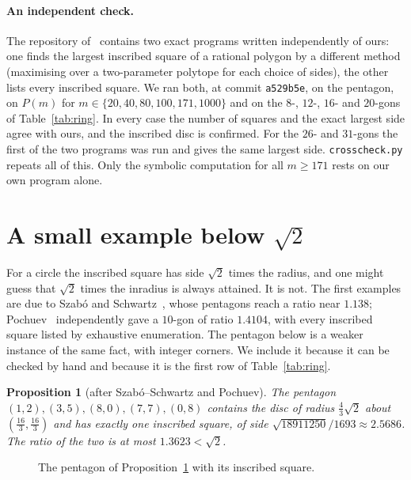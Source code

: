 \documentclass[11pt,a4paper]{article}
\newtheorem{proposition}[theorem]{Proposition}
\theoremstyle{remark}\newtheorem{remark}[theorem]{Remark}
\begin{document}
\paragraph{An independent check.} The repository of~\cite{schulz} contains two exact
programs written independently of ours: one finds the largest inscribed square of
a rational polygon by a different method (maximising over a two-parameter
polytope for each choice of sides), the other lists every inscribed square. We
ran both, at commit \texttt{a529b5e}, on the pentagon, on $P(m)$ for
$m\in\{20,40,80,100,171,1000\}$ and on the $8$-, $12$-, $16$- and $20$-gons of
Table~\ref{tab:ring}. In every case the number of squares and the exact largest
side agree with ours, and the inscribed disc is confirmed.
For the $26$- and $31$-gons the first of the two programs was run and gives the
same largest side. \texttt{crosscheck.py} repeats all of this. Only the symbolic computation
for all $m\ge171$ rests on our own program alone.

\appendix
\section{A small example below $\sqrt2$}

For a circle the inscribed square has side $\sqrt2$ times the radius, and one
might guess that $\sqrt2$ times the inradius is always attained. It is not. The first examples are due to Szab\'o and Schwartz~\cite{ss}, whose
pentagons reach a ratio near $1.138$; Pochuev~\cite{pochuev} independently gave a
$10$-gon of ratio $1.4104$, with every inscribed
square listed by exhaustive enumeration. The pentagon below is a weaker
instance of the same fact, with integer corners. We include it because it can be checked by hand and
because it is the first row of Table~\ref{tab:ring}.

\begin{proposition}[after Szab\'o--Schwartz and Pochuev]\label{prop:pentagon}
The pentagon $(1,2),(3,5),(8,0),(7,7),(0,8)$ contains the disc of radius
$\tfrac43\sqrt2$ about $(\tfrac{16}3,\tfrac{16}3)$ and has exactly one inscribed
square, of side $\sqrt{18911250}/1693\approx2.5686$. The ratio of the two is
at most $1.3623<\sqrt2$.
\end{proposition}

\begin{figure}[H]\centering
\caption{The pentagon of Proposition~\ref{prop:pentagon} with its inscribed square.}
\end{figure}
\end{document}

